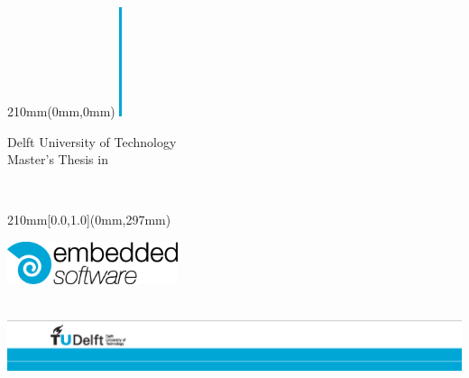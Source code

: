 
\begin {textblock*}{210mm}(0mm,0mm)
\noindent
\includegraphics[height=3.2cm]{pics/block}
\sffamily
\vspace{.8cm}
\begin{center}
\Large
Delft University of Technology\\
Master's Thesis in \reportMSC\\
\vspace{2cm}
\parbox{170mm}{\bfseries\centering\Huge\reportTitle}\\
\vspace{1cm}
\parbox{170mm}{\bfseries\centering\reportAuthor}

\end{center}
\end{textblock*}

\begin {textblock*}{210mm}[0.0,1.0](0mm,297mm)
\noindent
\hspace{1.89cm}


\hfill\parbox{5cm}{
\includegraphics[width=5cm]{pics/es_logo_cyan_black_rgb}}
\hspace*{2cm}\\

\vspace*{1.5cm}
\noindent
\includegraphics[width=\textwidth]{pics/TU_border_A4_L_front}
\end{textblock*}

\null\newpage
